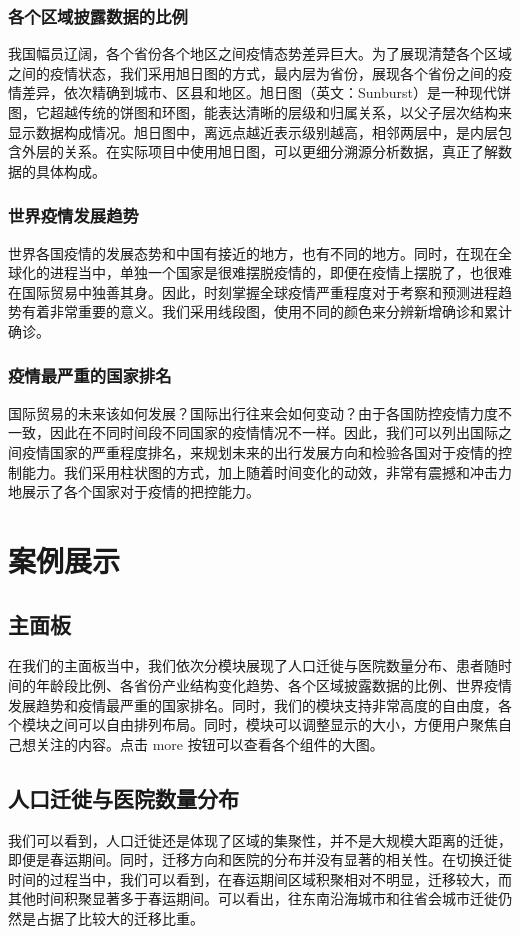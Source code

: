 \documentclass{ctexart}
\begin{document}
\subsubsection{各个区域披露数据的比例}
我国幅员辽阔，各个省份各个地区之间疫情态势差异巨大。为了展现清楚各个区域之间的疫情状态，我们采用旭日图的方式，最内层为省份，展现各个省份之间的疫情差异，依次精确到城市、区县和地区。旭日图（英文：Sunburst）是一种现代饼图，它超越传统的饼图和环图，能表达清晰的层级和归属关系，以父子层次结构来显示数据构成情况。旭日图中，离远点越近表示级别越高，相邻两层中，是内层包含外层的关系。在实际项目中使用旭日图，可以更细分溯源分析数据，真正了解数据的具体构成。
\subsubsection{世界疫情发展趋势}
世界各国疫情的发展态势和中国有接近的地方，也有不同的地方。同时，在现在全球化的进程当中，单独一个国家是很难摆脱疫情的，即便在疫情上摆脱了，也很难在国际贸易中独善其身。因此，时刻掌握全球疫情严重程度对于考察和预测进程趋势有着非常重要的意义。我们采用线段图，使用不同的颜色来分辨新增确诊和累计确诊。
\subsubsection{疫情最严重的国家排名}
国际贸易的未来该如何发展？国际出行往来会如何变动？由于各国防控疫情力度不一致，因此在不同时间段不同国家的疫情情况不一样。因此，我们可以列出国际之间疫情国家的严重程度排名，来规划未来的出行发展方向和检验各国对于疫情的控制能力。我们采用柱状图的方式，加上随着时间变化的动效，非常有震撼和冲击力地展示了各个国家对于疫情的把控能力。
\section{案例展示}
\subsection{主面板}
在我们的主面板当中，我们依次分模块展现了人口迁徙与医院数量分布、患者随时间的年龄段比例、各省份产业结构变化趋势、各个区域披露数据的比例、世界疫情发展趋势和疫情最严重的国家排名。同时，我们的模块支持非常高度的自由度，各个模块之间可以自由排列布局。同时，模块可以调整显示的大小，方便用户聚焦自己想关注的内容。点击 more 按钮可以查看各个组件的大图。
\subsection{人口迁徙与医院数量分布}
我们可以看到，人口迁徙还是体现了区域的集聚性，并不是大规模大距离的迁徙，即便是春运期间。同时，迁移方向和医院的分布并没有显著的相关性。在切换迁徙时间的过程当中，我们可以看到，在春运期间区域积聚相对不明显，迁移较大，而其他时间积聚显著多于春运期间。可以看出，往东南沿海城市和往省会城市迁徙仍然是占据了比较大的迁移比重。
\end{document}
